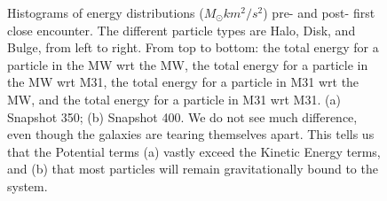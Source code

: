\documentclass[linenumbers, ]{aastex631}
\begin{document}
\begin{figure}[ht!]
\centering
      
      
\caption{\label{fig:potentialdists} Histograms of energy distributions ($M_\odot km^2/s^2$) pre- and post- first close encounter. The different particle types are Halo, Disk, and Bulge, from left to right. From top to bottom: the total energy for a particle in the MW wrt the MW, the total energy for a particle in the MW wrt M31, the total energy for a particle in M31 wrt the MW, and the total energy for a particle in M31 wrt M31. (a) Snapshot 350; (b) Snapshot 400. We do not see much difference, even though the galaxies are tearing themselves apart. This tells us that the Potential terms (a) vastly exceed the Kinetic Energy terms, and (b) that most particles will remain gravitationally bound to the system.}
\end{figure}
\end{document}
